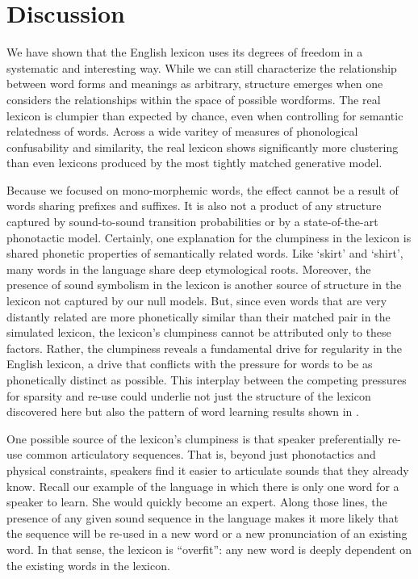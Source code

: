 \documentclass{article}
\begin{document}
\section{Discussion}

We have shown that the English lexicon uses its degrees of freedom in a systematic and interesting way. While
we can still characterize the relationship between word forms and meanings as arbitrary, structure emerges
when one considers the relationships within the space of possible wordforms. The real lexicon is clumpier than
expected by chance, even when controlling for semantic relatedness of words. Across a wide varitey of measures
of phonological confusability and similarity, the real lexicon shows significantly more clustering than even
lexicons produced by the most tightly matched generative model.

Because we focused on mono-morphemic words, the effect cannot be a result of words sharing prefixes and
suffixes. It is also not a product of any structure captured by sound-to-sound transition probabilities or by
a state-of-the-art phonotactic model. Certainly, one explanation for the clumpiness in the lexicon is shared
phonetic properties of semantically related words. Like `skirt' and `shirt', many words in the language share
deep etymological roots. Moreover, the presence of sound symbolism in the lexicon is another source of
structure in the lexicon not captured by our null models. But, since even words that are very distantly
related are more phonetically similar than their matched pair in the simulated lexicon, the lexicon's
clumpiness cannot be attributed only to these factors. Rather, the clumpiness reveals a fundamental drive for
regularity in the English lexicon, a drive that conflicts with the pressure for words to be as phonetically
distinct as possible. This interplay between the competing pressures for sparsity and re-use could underlie
not just the structure of the lexicon discovered here but also the pattern of word learning results shown in
\cite{storkel_differentiating_2006}.

One possible source of the lexicon's clumpiness is that speaker preferentially re-use common articulatory
sequences. That is, beyond just phonotactics and physical constraints, speakers find it easier to articulate
sounds that they already know. Recall our example of the language in which there is only one word for a
speaker to learn. She would quickly become an expert. Along those lines, the presence of any given sound
sequence in the language makes it more likely that the sequence will be re-used in a new word or a new
pronunciation of an existing word. In that sense, the lexicon is ``overfit'': any new word is deeply dependent
on the existing words in the lexicon.
\end{document}
